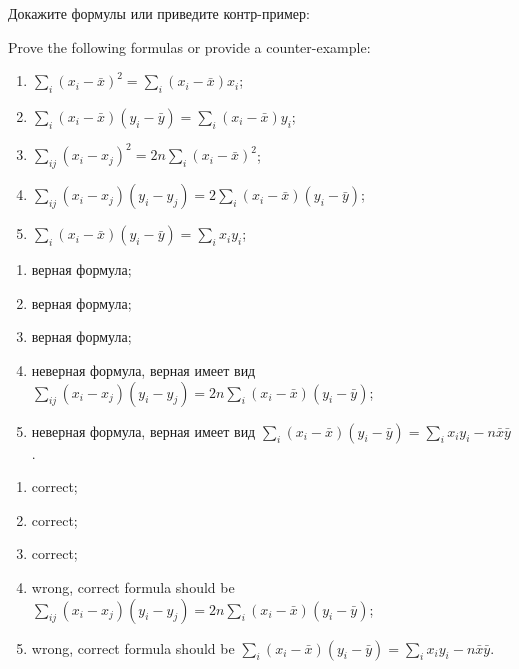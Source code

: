 \begin{problem}
\begin{translation-ru}
    Докажите формулы или приведите контр-пример:    
\end{translation-ru}
\begin{translation-en}
Prove the following formulas or provide a counter-example:
\end{translation-en}
\begin{enumerate}
\item $\sum_{i}(x_i - \bar x)^2 = \sum_i (x_i - \bar x) x_i$;
\item $\sum_{i}(x_i - \bar x)(y_i - \bar y) = \sum_i (x_i - \bar x) y_i$;
\item $\sum_{ij}(x_i - x_j)^2 = 2 n \sum_i(x_i - \bar x)^2$;
\item $\sum_{ij}(x_i - x_j)(y_i - y_j) = 2 \sum_i(x_i - \bar x)(y_i - \bar y)$;
\item $\sum_{i}(x_i - \bar x)(y_i - \bar y) = \sum_i x_i  y_i$;
\end{enumerate}

\begin{sol}
\begin{translation-ru}
\begin{enumerate}
\item верная формула;
\item верная формула;
\item верная формула;
\item неверная формула, верная имеет вид $\sum_{ij}(x_i - x_j)(y_i - y_j) = 2 n\sum_i(x_i - \bar x)(y_i - \bar y)$;
\item неверная формула, верная имеет вид $\sum_{i}(x_i - \bar x)(y_i - \bar y) = \sum_i x_i  y_i - n \bar x \bar y$.
\end{enumerate}            
\end{translation-ru}

\begin{translation-en}
\begin{enumerate}
\item correct;
\item correct;
\item correct;
\item wrong, correct formula should be $\sum_{ij}(x_i - x_j)(y_i - y_j) = 2 n\sum_i(x_i - \bar x)(y_i - \bar y)$;
\item wrong, correct formula should be $\sum_{i}(x_i - \bar x)(y_i - \bar y) = \sum_i x_i  y_i - n \bar x \bar y$.
\end{enumerate}            
\end{translation-en}
    
\end{sol}
\end{problem}
  



